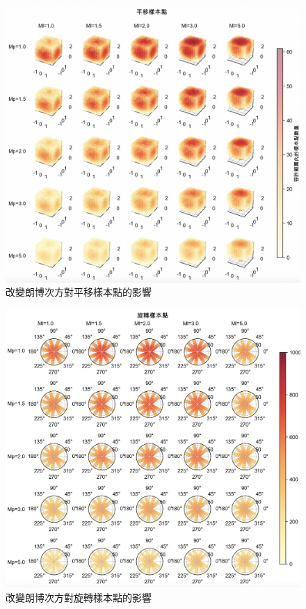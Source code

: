 \begin{figure}[htpb]
    \centering
    \includegraphics[width=14cm]{ch4pic/lambertian_translate.png}
    \caption{改變朗博次方對平移樣本點的影響}
    \label{pic:m_translate}
\end{figure}
\begin{figure}[htpb]
    \centering
    \includegraphics[width=14cm]{ch4pic/lambertian_rotate.png}
    \caption{改變朗博次方對旋轉樣本點的影響}
    \label{pic:m_rotate}
\end{figure}

